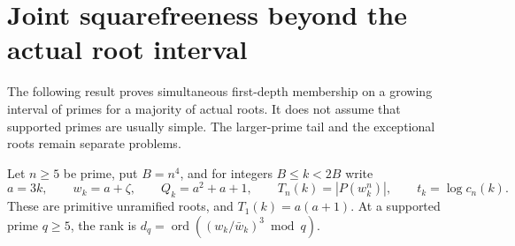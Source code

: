 \section{Joint squarefreeness beyond the actual root interval}
\label{sqw-section}

The following result proves simultaneous first-depth membership on a
growing interval of primes for a majority of actual roots. It does not
assume that supported primes are usually simple. The larger-prime tail
and the exceptional roots remain separate problems.

Let $n\ge5$ be prime, put $B=n^4$, and for integers $B\le k<2B$ write
\[
 a=3k,\qquad w_k=a+\zeta,\qquad Q_k=a^2+a+1,\qquad
 T_n(k)=|P(w_k^n)|,\qquad t_k=\log c_n(k).
\]
These are primitive unramified roots, and $T_1(k)=a(a+1)$.
At a supported prime $q\ge5$, the rank is
$d_q=\operatorname{ord}((w_k/\bar w_k)^3\bmod q)$.

